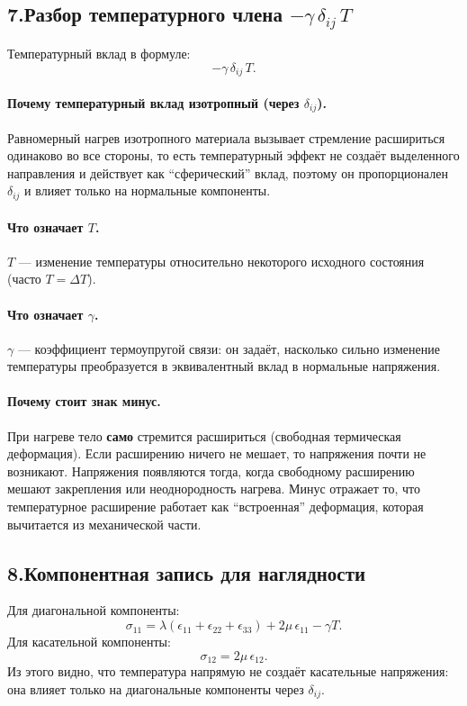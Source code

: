 \subsection*{7.\;Разбор температурного члена $-\gamma\,\delta_{ij}\,T$}
Температурный вклад в формуле:
\[
-\gamma\,\delta_{ij}\,T.
\]

\paragraph{Почему температурный вклад изотропный (через $\delta_{ij}$).}
Равномерный нагрев изотропного материала вызывает стремление расшириться одинаково во все стороны,
то есть температурный эффект не создаёт выделенного направления и действует как ``сферический'' вклад,
поэтому он пропорционален $\delta_{ij}$ и влияет только на нормальные компоненты.

\paragraph{Что означает $T$.}
$T$ --- изменение температуры относительно некоторого исходного состояния (часто $T=\Delta T$).

\paragraph{Что означает $\gamma$.}
$\gamma$ --- коэффициент термоупругой связи: он задаёт, насколько сильно изменение температуры преобразуется
в эквивалентный вклад в нормальные напряжения.

\paragraph{Почему стоит знак минус.}
При нагреве тело \textbf{само} стремится расшириться (свободная термическая деформация).
Если расширению ничего не мешает, то напряжения почти не возникают.
Напряжения появляются тогда, когда свободному расширению мешают закрепления или неоднородность нагрева.
Минус отражает то, что температурное расширение работает как ``встроенная'' деформация, которая вычитается
из механической части.

\subsection*{8.\;Компонентная запись для наглядности}
Для диагональной компоненты:
\[
\sigma_{11}=\lambda(\epsilon_{11}+\epsilon_{22}+\epsilon_{33})+2\mu\,\epsilon_{11}-\gamma T.
\]
Для касательной компоненты:
\[
\sigma_{12}=2\mu\,\epsilon_{12}.
\]
Из этого видно, что температура напрямую не создаёт касательные напряжения: она влияет только на диагональные
компоненты через $\delta_{ij}$.

